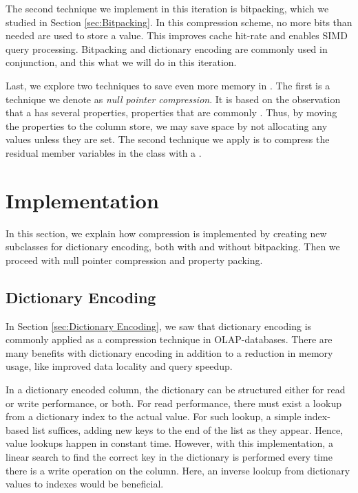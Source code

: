 The second technique we implement in this iteration is bitpacking, which we studied in Section \ref{sec:Bitpacking}. In this compression scheme, no more bits than needed are used to store a value. This improves cache hit-rate and enables SIMD query processing. Bitpacking and dictionary encoding are commonly used in conjunction, and this what we will do in this iteration.

Last, we explore two techniques to save even more memory in \gap. The first is a technique we denote as \textit{null pointer compression}. It is based on the observation that a  has several properties, properties that are commonly \nil. Thus, by moving the properties to the column store, we may save space by not allocating any values unless they are set. The second technique we apply is to compress the residual member variables in the  class with a .

\section{Implementation}
\label{sec:Implementation}
In this section, we explain how compression is implemented by creating new  subclasses for dictionary encoding, both with and without bitpacking. Then we proceed with null pointer compression and property packing.

\subsection{Dictionary Encoding}
\label{compression:dictionary-encoding}
In Section \ref{sec:Dictionary Encoding}, we saw that dictionary encoding is commonly applied as a compression technique in OLAP-databases. There are many benefits with dictionary encoding in addition to a reduction in memory usage, like improved data locality and query speedup.

In a dictionary encoded column, the dictionary can be structured either for read or write performance, or both. For read performance, there must exist a lookup from a dictionary index to the actual value. For such lookup, a simple index-based list suffices, adding new keys to the end of the list as they appear. Hence, value lookups happen in constant time. However, with this implementation, a linear search to find the correct key in the dictionary is performed every time there is a write operation on the column. Here, an inverse lookup from dictionary values to indexes would be beneficial.

